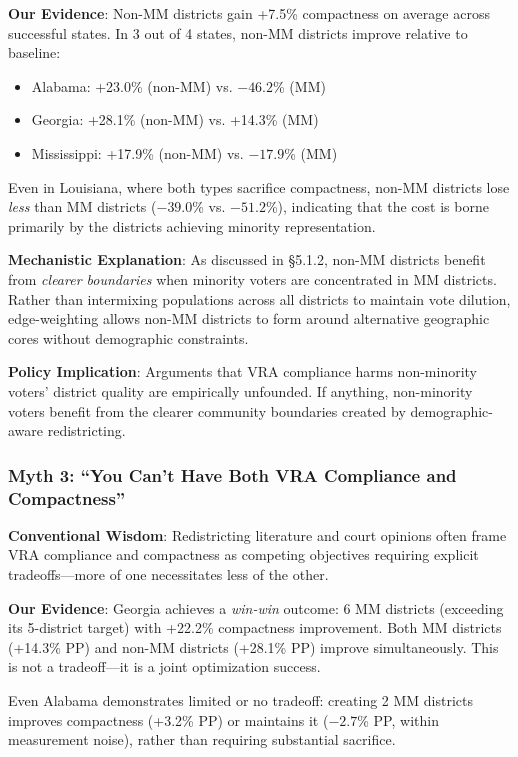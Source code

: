 \textbf{Our Evidence}: Non-MM districts gain +7.5\% compactness on average across successful states. In 3 out of 4 states, non-MM districts improve relative to baseline:
\begin{itemize}
    \item Alabama: +23.0\% (non-MM) vs. $-46.2$\% (MM)
    \item Georgia: +28.1\% (non-MM) vs. +14.3\% (MM)
    \item Mississippi: +17.9\% (non-MM) vs. $-17.9$\% (MM)
\end{itemize}

Even in Louisiana, where both types sacrifice compactness, non-MM districts lose \emph{less} than MM districts ($-39.0$\% vs. $-51.2$\%), indicating that the cost is borne primarily by the districts achieving minority representation.

\textbf{Mechanistic Explanation}: As discussed in \S5.1.2, non-MM districts benefit from \emph{clearer boundaries} when minority voters are concentrated in MM districts. Rather than intermixing populations across all districts to maintain vote dilution, edge-weighting allows non-MM districts to form around alternative geographic cores without demographic constraints.

\textbf{Policy Implication}: Arguments that VRA compliance harms non-minority voters' district quality are empirically unfounded. If anything, non-minority voters benefit from the clearer community boundaries created by demographic-aware redistricting.

\subsubsection{Myth 3: ``You Can't Have Both VRA Compliance and Compactness''}

\textbf{Conventional Wisdom}: Redistricting literature and court opinions often frame VRA compliance and compactness as competing objectives requiring explicit tradeoffs---more of one necessitates less of the other.

\textbf{Our Evidence}: Georgia achieves a \emph{win-win} outcome: 6 MM districts (exceeding its 5-district target) with +22.2\% compactness improvement. Both MM districts (+14.3\% PP) and non-MM districts (+28.1\% PP) improve simultaneously. This is not a tradeoff---it is a joint optimization success.

Even Alabama demonstrates limited or no tradeoff: creating 2 MM districts improves compactness (+3.2\% PP) or maintains it ($-2.7$\% PP, within measurement noise), rather than requiring substantial sacrifice.

